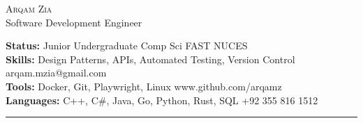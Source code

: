 \documentclass[10pt,A4]{article}
\newcommand{\cvsection}[1]
{
	\begin{center}
		\large\textcolor{sectcol}{\textbf{#1}}
	\end{center}
}
\newcommand{\metasection}[2]
{
\footnotesize{#2} \hspace*{\fill} \footnotesize{#1}\\[1pt]
}
\begin{document}
\pagestyle{fancy}	



\vspace{-8pt}
\begin{center}
	\HUGE \textsc{Arqam Zia} %
        \\[2pt]
	\small Software Development Engineer
\end{center}

\vspace{6pt}

\metasection{FAST NUCES}{\textbf{Status:} Junior Undergraduate Comp Sci}
\metasection{arqam.mzia@gmail.com}{\textbf{Skills:} Design Patterns, APIs, Automated Testing, Version Control} 
\metasection{www.github.com/arqamz}{\textbf{Tools:} Docker, Git, Playwright, Linux}
\metasection{+92 355 816 1512}{\textbf{Languages:} C++, C\#, Java, Go, Python, Rust, SQL}
\vspace{-2pt}
\textcolor{softcol}{\hrule}
\vspace{6pt}

\normalsize

\end{document}
